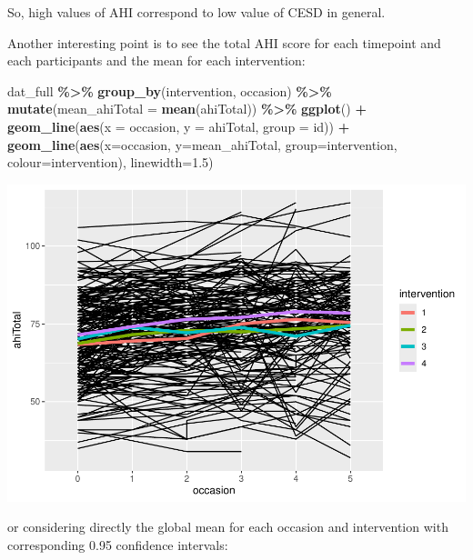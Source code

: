 \documentclass[
]{article}
\newenvironment{Shaded}{\begin{snugshade}}{\end{snugshade}}
\newcommand{\AttributeTok}[1]{\textcolor[rgb]{0.13,0.29,0.53}{#1}}
\newcommand{\FloatTok}[1]{\textcolor[rgb]{0.00,0.00,0.81}{#1}}
\newcommand{\FunctionTok}[1]{\textcolor[rgb]{0.13,0.29,0.53}{\textbf{#1}}}
\newcommand{\NormalTok}[1]{#1}
\newcommand{\SpecialCharTok}[1]{\textcolor[rgb]{0.81,0.36,0.00}{\textbf{#1}}}
\begin{document}
So, high values of AHI correspond to low value of CESD in general.

Another interesting point is to see the total AHI score for each
timepoint and each participants and the mean for each intervention:

\begin{Shaded}
\begin{Highlighting}[]
\NormalTok{dat\_full }\SpecialCharTok{\%\textgreater{}\%}
  \FunctionTok{group\_by}\NormalTok{(intervention, occasion) }\SpecialCharTok{\%\textgreater{}\%}
  \FunctionTok{mutate}\NormalTok{(}\AttributeTok{mean\_ahiTotal =} \FunctionTok{mean}\NormalTok{(ahiTotal)) }\SpecialCharTok{\%\textgreater{}\%}
  \FunctionTok{ggplot}\NormalTok{() }\SpecialCharTok{+} 
  \FunctionTok{geom\_line}\NormalTok{(}\FunctionTok{aes}\NormalTok{(}\AttributeTok{x =}\NormalTok{ occasion, }\AttributeTok{y =}\NormalTok{ ahiTotal, }\AttributeTok{group =}\NormalTok{ id)) }\SpecialCharTok{+}
    \FunctionTok{geom\_line}\NormalTok{(}\FunctionTok{aes}\NormalTok{(}\AttributeTok{x=}\NormalTok{occasion, }
           \AttributeTok{y=}\NormalTok{mean\_ahiTotal, }
           \AttributeTok{group=}\NormalTok{intervention,}
           \AttributeTok{colour=}\NormalTok{intervention), }\AttributeTok{linewidth=}\FloatTok{1.5}\NormalTok{) }
\end{Highlighting}
\end{Shaded}

\includegraphics{RealData_example_files/figure-latex/unnamed-chunk-12-1.pdf}

or considering directly the global mean for each occasion and
intervention with corresponding 0.95 confidence intervals:
\end{document}
